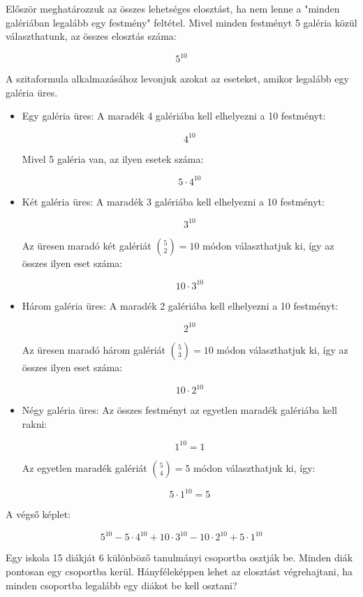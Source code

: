 \begin{solution}
Először meghatározzuk az összes lehetséges elosztást, ha nem lenne
a "minden galériában legalább egy festmény" feltétel. Mivel minden
festményt 5 galéria közül választhatunk, az összes elosztás száma:

\[
5^{10}
\]

A szitaformula alkalmazásához levonjuk azokat az eseteket, amikor
legalább egy galéria üres.
\begin{itemize}
\item Egy galéria üres: A maradék 4 galériába kell elhelyezni a 10 festményt:

\[
4^{10}
\]

Mivel 5 galéria van, az ilyen esetek száma:

\[
5\cdot4^{10}
\]

\item Két galéria üres: A maradék 3 galériába kell elhelyezni a 10 festményt:

\[
3^{10}
\]

Az üresen maradó két galériát $\binom{5}{2}=10$ módon választhatjuk
ki, így az összes ilyen eset száma:

\[
10\cdot3^{10}
\]

\item Három galéria üres: A maradék 2 galériába kell elhelyezni a 10 festményt:

\[
2^{10}
\]

Az üresen maradó három galériát $\binom{5}{3}=10$ módon választhatjuk
ki, így az összes ilyen eset száma:

\[
10\cdot2^{10}
\]

\item Négy galéria üres: Az összes festményt az egyetlen maradék galériába
kell rakni:

\[
1^{10}=1
\]

Az egyetlen maradék galériát $\binom{5}{4}=5$ módon választhatjuk
ki, így:

\[
5\cdot1^{10}=5
\]

\end{itemize}
A végső képlet:

\[
5^{10}-5\cdot4^{10}+10\cdot3^{10}-10\cdot2^{10}+5\cdot1^{10}
\]
\end{solution}
\begin{extraproblem}
Egy iskola 15 diákját 6 különböző tanulmányi csoportba osztják be.
Minden diák pontosan egy csoportba kerül. Hányféleképpen lehet az
elosztást végrehajtani, ha minden csoportba legalább egy diákot be
kell osztani? 
\end{extraproblem}

